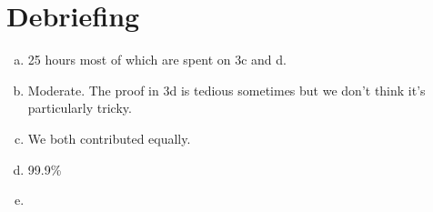 \section{Debriefing}
\begin{enumerate}[(a)]
\item 25 hours most of which are spent on 3c and d.
\item Moderate. The proof in 3d is tedious sometimes but we don't think it's particularly tricky.
\item We both contributed equally.
\item 99.9\%
\item
\end{enumerate}
